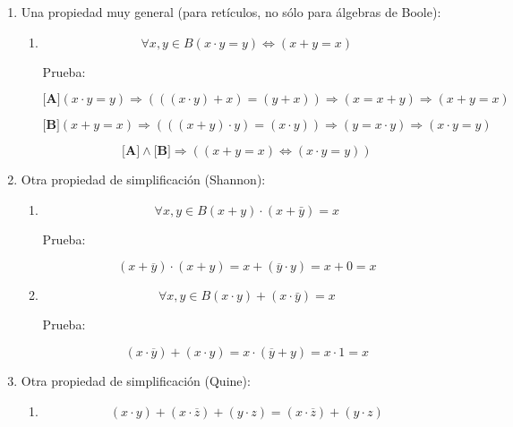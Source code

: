 \begin{enumerate}
\begin{enumerate}
\begin{enumerate}
\begin{enumerate}
        Prueba:

        \[{{{{x \cdot {({x + y})}} = {{({x + 0})} \cdot {({x + y})}}} = {x + {({0 \cdot y})}}} = {x + 0}} = x\]
      \end{enumerate}
    \item
      Una propiedad muy general (para retículos, no sólo para álgebras
      de Boole):

      \begin{enumerate}
      \def\labelenumiv{\arabic{enumiv}.}
      \item
        \[\forall x,{y \in B}{({{x \cdot y} = y})}\Leftrightarrow{({{x + y} = x})}\]

        Prueba:

        \[{\lbrack\mathbf{A}\rbrack}{({{x \cdot y} = y})}\Rightarrow{({{({{({x \cdot y})} + x})} = {({y + x})}})}\Rightarrow{({x = {x + y}})}\Rightarrow{({{x + y} = x})}\]

        \[{\lbrack\mathbf{B}\rbrack}{({{x + y} = x})}\Rightarrow{({{({{({x + y})} \cdot y})} = {({x \cdot y})}})}\Rightarrow{({y = {x \cdot y}})}\Rightarrow{({{x \cdot y} = y})}\]

        \[{{\lbrack\mathbf{A}\rbrack} \land {\lbrack\mathbf{B}\rbrack}}\Rightarrow{({{({{x + y} = x})}\Leftrightarrow{({{x \cdot y} = y})}})}\]
      \end{enumerate}
    \item
      Otra propiedad de simplificación (Shannon):

      \begin{enumerate}
      \def\labelenumiv{\arabic{enumiv}.}
      \item
        \[\forall x,{y \in B}{{{({x + y})} \cdot {({x + \bar{y}})}} = x}\]

        Prueba:

        \[{{{{({x + \overline{y}})} \cdot {({x + y})}} = {x + {({\overline{y} \cdot y})}}} = {x + 0}} = x\]
      \item
        \[\forall x,{y \in B}{{{({x \cdot y})} + {({x \cdot \bar{y}})}} = x}\]

        Prueba:

        \[{{{{({x \cdot \overline{y}})} + {({x \cdot y})}} = {x \cdot {({\overline{y} + y})}}} = {x \cdot 1}} = x\]
      \end{enumerate}
    \item
      Otra propiedad de simplificación (Quine):

      \begin{enumerate}
      \def\labelenumiv{\arabic{enumiv}.}
      \item
        \[{{\left( {x \cdot y} \right) + \left( {x \cdot \overline{z}} \right)} + \left( {y \cdot z} \right)} = {\left( {x \cdot \overline{z}} \right) + \left( {y \cdot z} \right)}\]


\end{enumerate}
\end{enumerate}
\end{enumerate}
\end{enumerate}
